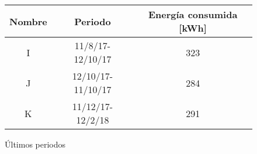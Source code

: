 \documentclass[]{article}
\begin{document}
\begin{figure}[h!]
	\centering
	\begin{tabular}[]{|c|c|c|}
		\hline
		Nombre & Periodo & Energía consumida [kWh]\\
		\hline
	I & 11/8/17-12/10/17 & 323 \\
	
	J & 12/10/17-11/10/17 & 284 \\
		K & 11/12/17-12/2/18 & 291 \\
	
		\hline
	\end{tabular}
	\label{cuadro:ultimosPeriodos}
	\caption{Últimos periodos}
	
\end{figure}



%
\end{document}
